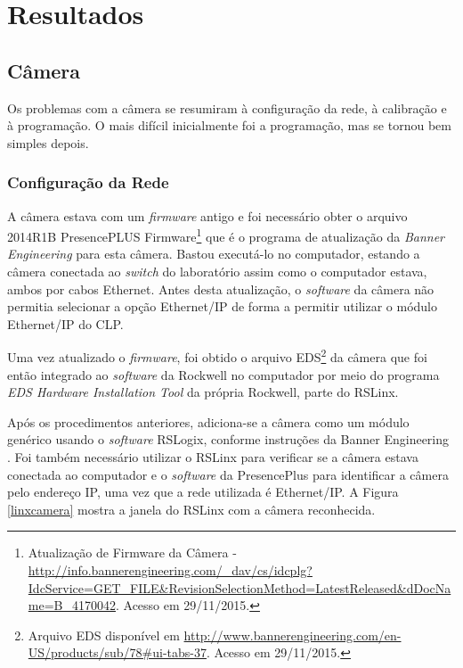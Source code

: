 \chapter{Resultados\label{chap:Resultados}}



\section{Câmera}

Os problemas com a câmera se resumiram à configuração da rede, à calibração e à programação. O mais difícil inicialmente foi a programação, mas se tornou bem simples depois.

\subsection{Configuração da Rede}
A câmera estava com um \textit{firmware} antigo e foi necessário obter o arquivo 2014R1B PresencePLUS Firmware\footnote{Atualização de Firmware da Câmera - \url{http://info.bannerengineering.com/_dav/cs/idcplg?IdcService=GET_FILE&RevisionSelectionMethod=LatestReleased&dDocName=B_4170042}. Acesso em 29/11/2015.} que é o programa de atualização da \textit{Banner Engineering} para esta câmera. Bastou executá-lo no computador, estando a câmera conectada ao \textit{switch} do laboratório assim como o computador estava, ambos por cabos Ethernet. Antes desta atualização, o \textit{software} da câmera não permitia selecionar a opção Ethernet/IP de forma a permitir utilizar o módulo Ethernet/IP do CLP.

Uma vez atualizado o \textit{firmware}, foi obtido o arquivo EDS\footnote{Arquivo EDS disponível em \url{http://www.bannerengineering.com/en-US/products/sub/78\#ui-tabs-37}. Acesso em 29/11/2015.} da câmera que foi então integrado ao \textit{software} da Rockwell no computador por meio do programa \textit{EDS Hardware Installation Tool} da própria Rockwell, parte do RSLinx.

Após os procedimentos anteriores, adiciona-se a câmera como um módulo genérico usando o \textit{software} RSLogix, conforme instruções da Banner Engineering \cite{presencePlusEthernetIP}. Foi também necessário utilizar o RSLinx para verificar se a câmera  estava conectada ao computador e o \textit{software} da PresencePlus para identificar a câmera pelo endereço IP, uma vez que a rede utilizada é Ethernet/IP. A Figura \ref{linxcamera} mostra a janela do RSLinx com a câmera reconhecida.

